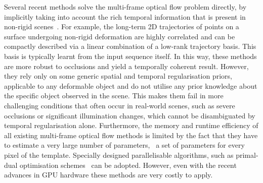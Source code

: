 Several recent methods solve the multi-frame optical flow problem directly, by
implicitly taking into account the rich temporal information that is present in
non-rigid scenes~\cite{irani2002multi,torresani2001tracking,torresani2002space,%
tomasi2012dense,ricco2013video,garg2013variational}.
For example, the long-term 2D trajectories of points on a surface undergoing
non-rigid deformation are highly correlated and can be compactly described
via a linear combination of a low-rank trajectory basis.
This basis is typically learnt from the input sequence itself. In
this way, these methods are more robust to occlusions and yield a temporally coherent
result. However, they rely only on some generic spatial and temporal regularisation
priors, applicable to any deformable object and do not utilise any prior knowledge
about the specific object observed in the scene. This makes them fail in more challenging
conditions that often occur in real-world scenes, such as severe occlusions or
significant illumination changes, which cannot be disambiguated by temporal
regularisation alone.
Furthermore, the memory and runtime efficiency of all existing multi-frame optical
flow methods is limited by the fact that they have to estimate a very large number
of parameters, \ie~a set of parameters for every pixel of the template.
Specially designed parallelisable algorithms, such as primal-dual optimisation
schemes~\cite{wedel2009improved,garg2013variational}
can be adopted. However, even with the recent advances in GPU hardware these
methods are very costly to apply.


